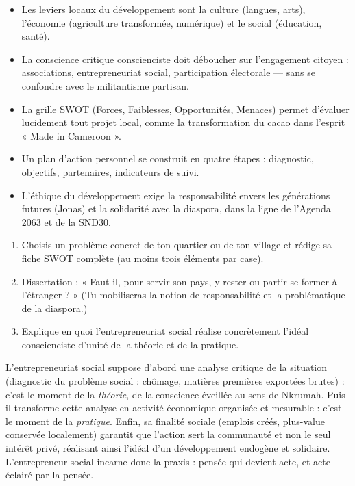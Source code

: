 \documentclass[11pt]{article}
\newcommand{\cle}[1]{{\popxbold\color{popdark}#1}}
\begin{document}
\begin{aretenir}
\begin{itemize}
\item Les leviers locaux du développement sont la culture (langues, arts), l'économie (agriculture transformée, numérique) et le social (éducation, santé).
\item La conscience critique conscienciste doit déboucher sur l'engagement citoyen : associations, entrepreneuriat social, participation électorale — sans se confondre avec le militantisme partisan.
\item La grille SWOT (Forces, Faiblesses, Opportunités, Menaces) permet d'évaluer lucidement tout projet local, comme la transformation du cacao dans l'esprit « Made in Cameroon ».
\item Un plan d'action personnel se construit en quatre étapes : diagnostic, objectifs, partenaires, indicateurs de suivi.
\item L'éthique du développement exige la responsabilité envers les générations futures (Jonas) et la solidarité avec la diaspora, dans la ligne de l'Agenda 2063 et de la SND30.
\end{itemize}
\end{aretenir}

\begin{exercice}
\begin{enumerate}
\item Choisis un problème concret de ton quartier ou de ton village et rédige sa fiche SWOT complète (au moins trois éléments par case).
\item Dissertation : « Faut-il, pour servir son pays, y rester ou partir se former à l'étranger ? » (Tu mobiliseras la notion de responsabilité et la problématique de la diaspora.)
\item Explique en quoi l'entrepreneuriat social réalise concrètement l'idéal conscienciste d'unité de la théorie et de la pratique.
\end{enumerate}
\end{exercice}

\begin{corrige}
L'entrepreneuriat social suppose d'abord une analyse critique de la situation (diagnostic du problème social : chômage, matières premières exportées brutes) : c'est le moment de la \emph{théorie}, de la conscience éveillée au sens de Nkrumah. Puis il transforme cette analyse en activité économique organisée et mesurable : c'est le moment de la \emph{pratique}. Enfin, sa finalité sociale (emplois créés, plus-value conservée localement) garantit que l'action sert la communauté et non le seul intérêt privé, réalisant ainsi l'idéal d'un développement endogène et solidaire. L'entrepreneur social incarne donc la \cle{praxis} : pensée qui devient acte, et acte éclairé par la pensée.
\end{corrige}
\end{document}
